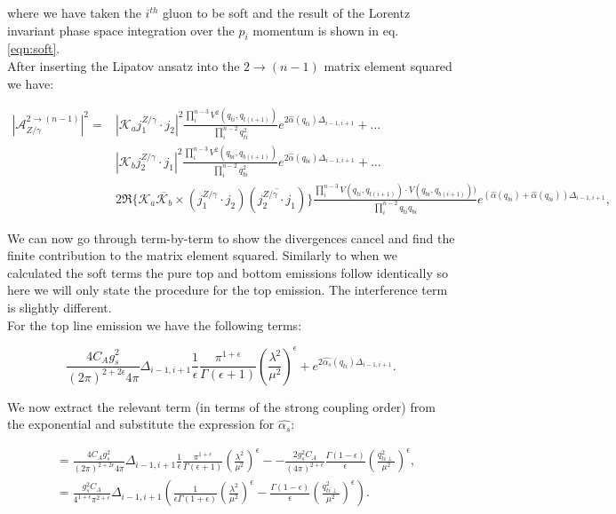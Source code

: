 		where we have taken the $i^{th}$ gluon to be soft and the result of the Lorentz invariant phase space
		integration over the $p_i$ momentum is shown in eq. \eqref{eqn:soft}.\\After inserting the Lipatov
		ansatz into the $2\rightarrow (n-1)$ matrix element squared we have:

		\begin{align}
			|\mathcal{A}_{Z/\gamma}^{2\rightarrow (n-1)}|^2 = &\left|\mathcal{K}_a j_1^{Z/\gamma}\cdot j_2\right|^2
				\frac{\prod^{n-3}_{i}V^2(q_{ti}, q_{t(i+1)})}{\prod^{n-2}_{i}q^2_{ti}}e^{2\hat{\alpha}(q_{ti})\Delta_{i-1,i+1}} + \ldots \\
				&\left|\mathcal{K}_b j_2^{Z/\gamma}\cdot j_1\right|^2 \frac{\prod^{n-3}_{i}V^2(q_{bi}, q_{b(i+1)})}
				{\prod^{n-2}_{i}q^2_{bi}}e^{2\hat{\alpha}(q_{bi})\Delta_{i-1,i+1}} + \ldots \\
				&2\Re\{\mathcal{K}_a\overline{\mathcal{K}_b} \times (j_1^{Z/\gamma}\cdot j_2)(\overline{j_2^{Z/\gamma}\cdot j_1})\}
				\frac{\prod^{n-3}_{i}V(q_{ti}, q_{t(i+1)})\cdot V(q_{bi}, q_{b(i+1)}))}{\prod^{n-2}_{i}q_{ti}q_{bi}}
				e^{(\hat{\alpha}(q_{bi}) + \hat{\alpha}(q_{bi}))\Delta_{i-1,i+1}},
		\end{align}

		We can now go through term-by-term to show the divergences cancel and find the finite contribution to
		the matrix element squared.  Similarly to when we calculated the soft terms the pure top and bottom
		emissions follow identically so here we will only state the procedure for the top emission.  The
		interference term is slightly different.\\For the top line emission we have the following terms:

		\begin{equation}
			\frac{4C_Ag_s^2}{(2\pi)^{2+2\epsilon}4\pi}\Delta_{i-1, i+1}\frac{1}{\epsilon}\frac{\pi^{1+\epsilon}}
			{\Gamma(\epsilon+1)}\left(\frac{\lambda^2}{\mu^2}\right)^\epsilon + e^{2\hat{\alpha_s}(q_{ti})\Delta_{i-1,i+1}}.
		\end{equation}

		We now extract the relevant term (in terms of the strong coupling order) from the
		exponential and substitute the expression for $\hat{\alpha_s}$:

		\begin{align}
			&= \frac{4C_Ag_s^2}{(2\pi)^{2+2\epsilon}4\pi}\Delta_{i-1, i+1}\frac{1}{\epsilon}\frac{\pi^{1+\epsilon}}
			{\Gamma(\epsilon+1)}\left(\frac{\lambda^2}{\mu^2}\right)^\epsilon - -\frac{2g_s^2C_A}{(4\pi)^{2+\epsilon}}
			\frac{\Gamma(1-\epsilon)}{\epsilon}\left(\frac{q_{ti\perp}^2}{\mu^2}\right)^\epsilon, \\
			&= \frac{g_s^2C_A}{4^{1+\epsilon}\pi^{2+\epsilon}}\Delta_{i-1, i+1}\left(\frac{1}{\epsilon\Gamma(1+\epsilon)}
			\left(\frac{\lambda^2}{\mu^2}\right)^\epsilon - \frac{\Gamma(1-\epsilon)}{\epsilon}
			\left(\frac{q_{ti\perp}^2}{\mu^2}\right)^\epsilon\right).
		\end{align}

